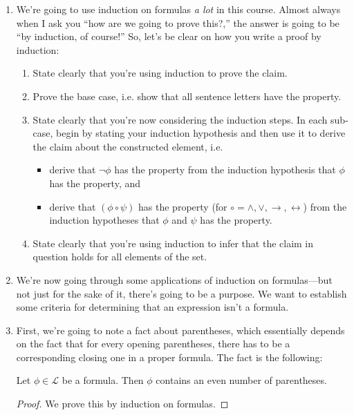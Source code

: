 \begin{enumerate}[\thesection.1]
		\item We're going to use induction on formulas \emph{a lot} in this course. Almost always when I ask you ``how are we going to prove this?,'' the answer is going to be ``by induction, of course!'' So, let's be clear on how you write a proof by induction:
			\begin{enumerate}[1.]
		
			\item State clearly that you're using induction to prove the claim.
			
			\item Prove the base case, i.e. show that all sentence letters have the property.
			
			\item State clearly that you're now considering the induction steps. In each sub-case, begin by stating your induction hypothesis and then use it to derive the claim about the constructed element, i.e.
			\begin{itemize}
			
				\item derive that $\neg\phi$ has the property from the induction hypothesis that $\phi$ has the property, and
				
				\item derive that $(\phi\circ\psi)$ has the property (for $\circ=\land,\lor,\to,\leftrightarrow$) from the induction hypotheses that $\phi$ and $\psi$ has the property.
			
			\end{itemize}
			
			\item State clearly that you're using induction to infer that the claim in question holds for all elements of the set.
		
		\end{enumerate}
		
	\item We're now going through some applications of induction on formulas---but not just for the sake of it, there's going to be a purpose. We want to establish some criteria for determining that an expression isn't a formula. 
	
	\item First, we're going to note a fact about parentheses, which essentially depends on the fact that for every opening parentheses, there has to be a corresponding closing one in a proper formula. The fact is the following:
	\begin{proposition}
	Let $\phi\in\mathcal{L}$ be a formula. Then $\phi$ contains an even number of parentheses.
	\end{proposition}
	\begin{proof}
	We prove this by induction on formulas. 
	

\end{proof}
\end{enumerate}
